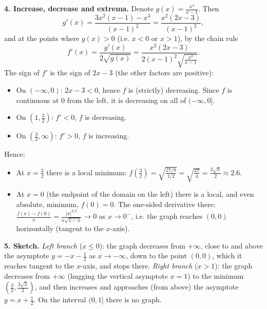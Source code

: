 \begin{solution}
\textbf{4. Increase, decrease and extrema.} Denote $g(x)=\frac{x^3}{x-1}$. Then
\[ g'(x)=\frac{3x^2(x-1)-x^3}{(x-1)^2}=\frac{x^2(2x-3)}{(x-1)^2}, \]
and at the points where $g(x)>0$ (i.e. $x<0$ or $x>1$), by the chain rule
\[ f'(x)=\frac{g'(x)}{2\sqrt{g(x)}}=\frac{x^2(2x-3)}{2(x-1)^2\sqrt{\frac{x^3}{x-1}}}. \]
The sign of $f'$ is the sign of $2x-3$ (the other factors are positive):
\begin{itemize}
  \item On $(-\infty,0)$: $2x-3<0$, hence $f$ is (strictly) decreasing. Since $f$ is continuous at $0$ from the left, it is decreasing on all of $(-\infty,0]$.
  \item On $\left(1,\frac32\right)$: $f'<0$, $f$ is decreasing.
  \item On $\left(\frac32,\infty\right)$: $f'>0$, $f$ is increasing.
\end{itemize}
Hence:
\begin{itemize}
  \item At $x=\frac32$ there is a local minimum: $f\left(\frac32\right)=\sqrt{\frac{27/8}{1/2}}=\sqrt{\frac{27}{4}}=\frac{3\sqrt3}{2}\approx2.6$.
  \item At $x=0$ (the endpoint of the domain on the left) there is a local, and even absolute, minimum, $f(0)=0$. The one-sided derivative there: $\frac{f(x)-f(0)}{x}=\frac{|x|^{3/2}}{x\sqrt{1-x}}\to0$ as $x\to0^-$, i.e. the graph reaches $(0,0)$ horizontally (tangent to the $x$-axis).
\end{itemize}

\textbf{5. Sketch.} \emph{Left branch} ($x\le0$): the graph decreases from $+\infty$, close to and above the asymptote $y=-x-\frac12$ as $x\to-\infty$, down to the point $(0,0)$, which it reaches tangent to the $x$-axis, and stops there. \emph{Right branch} ($x>1$): the graph decreases from $+\infty$ (hugging the vertical asymptote $x=1$) to the minimum $\left(\frac32,\frac{3\sqrt3}{2}\right)$, and then increases and approaches (from above) the asymptote $y=x+\frac12$. On the interval $(0,1]$ there is no graph.
\end{solution}
